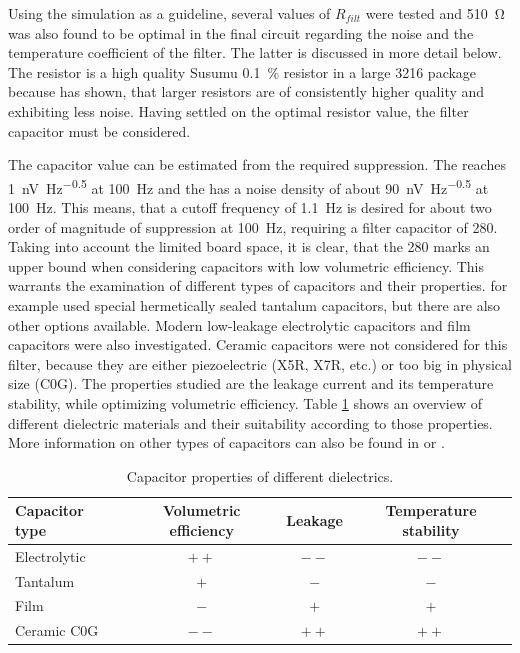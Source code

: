 Using the simulation as a guideline, several values of $R_{filt}$ were tested and \qty{510}{\ohm} was also found to be optimal in the final circuit regarding the noise and the temperature coefficient of the filter. The latter is discussed in more detail below. The resistor is a high quality Susumu  \qty{0.1}{\percent} resistor in a large 3216 package because \citeauthor{resistor_current_noise_ligo} \cite{resistor_current_noise_ligo} has shown, that larger resistors are of consistently higher quality and exhibiting less noise. Having settled on the optimal resistor value, the filter capacitor must be considered.

The capacitor value can be estimated from the required suppression. The  reaches \qty{1}{\nV \Hz\tothe{-0.5}} at \qty{100}{\Hz} and the  has a noise density of about \qty{90}{\nV \Hz\tothe{-0.5}} at \qty{100}{\Hz}. This means, that a cutoff frequency of \qty{1.1}{\Hz} is desired for about two order of magnitude of suppression at \qty{100}{\Hz}, requiring a filter capacitor of \qty{280}{\uF}. Taking into account the limited board space, it is clear, that the \qty{280}{\uF} marks an upper bound when considering capacitors with low volumetric efficiency. This warrants the examination of different types of capacitors and their properties. \citeauthor{libbrecht_hall} \cite{libbrecht_hall} for example used special hermetically sealed tantalum capacitors, but there are also other options available. Modern low-leakage electrolytic capacitors and film capacitors were also investigated. Ceramic capacitors were not considered for this filter, because they are either piezoelectric (X5R, X7R, etc.) or too big in physical size (C0G). The properties studied are the leakage current and its temperature stability, while optimizing volumetric efficiency. Table \ref{tab:capacitor_properties} shows an overview of different dielectric materials and their suitability according to those properties. More information on other types of capacitors can also be found in \cite{linear_circuit_design_handbook} or \cite{basic_linear_design}.
\begin{table}[ht]
    \centering
    \begin{tabular}{lccc}
        \toprule
        Capacitor type& Volumetric efficiency & Leakage& Temperature stability\\
        \midrule
        Electrolytic & $++$ & $--$ & $--$\\
        Tantalum & $+$ & $-$ & $-$\\
        Film & $-$ & $+$ & $+$\\
        Ceramic C0G & $--$ & $++$ & $++$\\
        \bottomrule
    \end{tabular}
    \caption{Capacitor properties of different dielectrics.}
    \label{tab:capacitor_properties}
\end{table}

